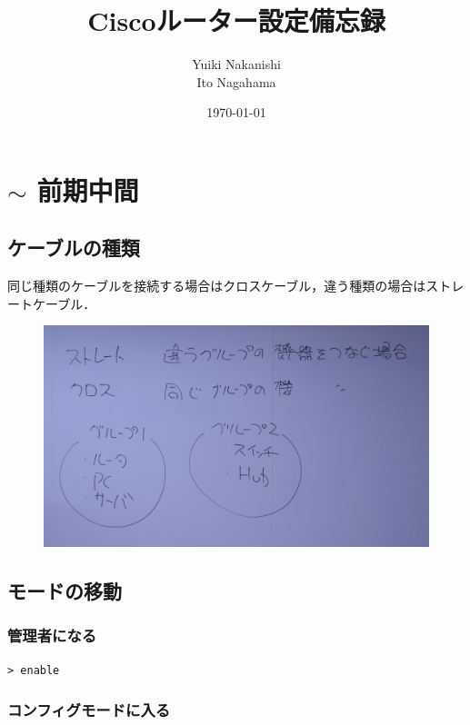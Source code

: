\documentclass[uplatex,dvipdfmx]{bxjsarticle}
\title{Ciscoルーター設定備忘録}
\author{Yuiki Nakanishi\\Ito Nagahama}
\date{\today}
\begin{document}
\maketitle

\section{$\sim$ 前期中間}

\subsection{ケーブルの種類}

同じ種類のケーブルを接続する場合はクロスケーブル，違う種類の場合はストレートケーブル．

\begin{figure}[htbp]
  \centering
  \includegraphics[width=1\linewidth]{figure/lan.JPG}
\end{figure}

\subsection{モードの移動}

\subsubsection{管理者になる}

\begin{lstlisting}[caption={管理者になる}]
> enable
\end{lstlisting}

\subsubsection{コンフィグモードに入る}
\end{document}
